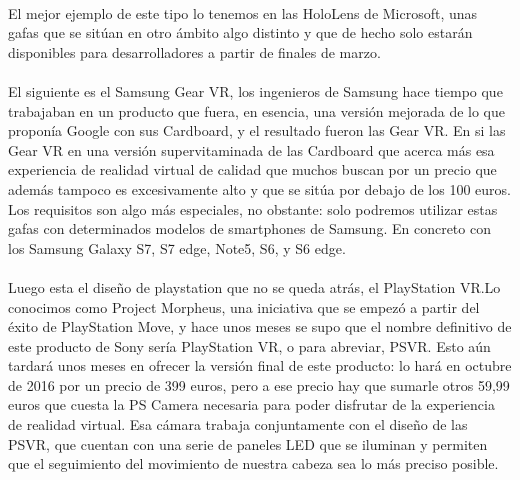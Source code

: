 \documentclass{bmcart}
\begin{document}
\paragraph{}
El mejor ejemplo de este tipo lo tenemos en las HoloLens de Microsoft, unas gafas que se sitúan en otro ámbito algo distinto y que de hecho solo estarán disponibles para desarrolladores a partir de finales de marzo.
\paragraph{}
\paragraph{}
El siguiente es el Samsung Gear VR, los ingenieros de Samsung hace tiempo que trabajaban en un producto que fuera, en esencia, una versión mejorada de lo que proponía Google con sus Cardboard, y el resultado fueron las Gear VR. En si las Gear VR en una versión supervitaminada de las Cardboard que acerca más esa experiencia de realidad virtual de calidad que muchos buscan por un precio que además tampoco es excesivamente alto y que se sitúa por debajo de los 100 euros. Los requisitos son algo más especiales, no obstante: solo podremos utilizar estas gafas con determinados modelos de smartphones de Samsung. En concreto con los Samsung Galaxy S7, S7 edge, Note5, S6, y S6 edge.
\paragraph{}
Luego esta el diseño de playstation que no se queda atrás, el PlayStation VR.Lo conocimos como Project Morpheus, una iniciativa que se empezó a partir del éxito de PlayStation Move, y hace unos meses se supo que el nombre definitivo de este producto de Sony sería PlayStation VR, o para abreviar, PSVR. Esto aún tardará unos meses en ofrecer la versión final de este producto: lo hará en octubre de 2016 por un precio de 399 euros, pero a ese precio hay que sumarle otros 59,99 euros que cuesta la PS Camera necesaria para poder disfrutar de la experiencia de realidad virtual. Esa cámara trabaja conjuntamente con el diseño de las PSVR, que cuentan con una serie de paneles LED que se iluminan y permiten que el seguimiento del movimiento de nuestra cabeza sea lo más preciso posible.
\end{document}
